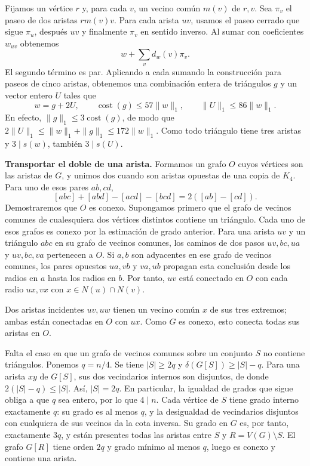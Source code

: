 \documentclass[spanish,11pt,a4paper]{article}
\begin{document}
Fijamos un vértice \(r\) y, para cada \(v\), un vecino común \(m(v)\) de \(r,v\). Sea \(\pi_v\) el paseo de dos aristas \(r m(v)v\). Para cada arista \(uv\), usamos el paseo cerrado que sigue \(\pi_u\), después \(uv\) y finalmente \(\pi_v\) en sentido inverso. Al sumar con coeficientes \(w_{uv}\) obtenemos \[w+\sum_v d_w(v)\pi_v.\] El segundo término es par. Aplicando a cada sumando la construcción para paseos de cinco aristas, obtenemos una combinación entera de triángulos \(g\) y un vector entero \(U\) tales que \[w=g+2U,\qquad \operatorname{cost}(g)\le57\|w\|_1,
\qquad \|U\|_1\le86\|w\|_1.
\tag{A.1}\] En efecto, \(\|g\|_1\le3\operatorname{cost}(g)\), de modo que \(2\|U\|_1\le\|w\|_1+\|g\|_1\le172\|w\|_1\). Como todo triángulo tiene tres aristas y \(3\mid s(w)\), también \(3\mid s(U)\).

\textbf{Transportar el doble de una arista.} Formamos un grafo \(O\) cuyos vértices son las aristas de \(G\), y unimos dos cuando son aristas opuestas de una copia de \(K_4\). Para uno de esos pares \(ab,cd\), \[[abc]+[abd]-[acd]-[bcd]=2([ab]-[cd]).
\tag{A.2}\] Demostraremos que \(O\) es conexo. Supongamos primero que el grafo de vecinos comunes de cualesquiera dos vértices distintos contiene un triángulo. Cada uno de esos grafos es conexo por la estimación de grado anterior. Para una arista \(uv\) y un triángulo \(abc\) en su grafo de vecinos comunes, los caminos de dos pasos \(uv,bc,ua\) y \(uv,bc,va\) pertenecen a \(O\). Si \(a,b\) son adyacentes en ese grafo de vecinos comunes, los pares opuestos \(ua,vb\) y \(va,ub\) propagan esta conclusión desde los radios en \(a\) hasta los radios en \(b\). Por tanto, \(uv\) está conectado en \(O\) con cada radio \(ux,vx\) con \(x\in N(u)\cap N(v)\).

Dos aristas incidentes \(uv,uw\) tienen un vecino común \(x\) de sus tres extremos; ambas están conectadas en \(O\) con \(ux\). Como \(G\) es conexo, esto conecta todas sus aristas en \(O\).

Falta el caso en que un grafo de vecinos comunes sobre un conjunto \(S\) no contiene triángulos. Ponemos \(q=n/4\). Se tiene \(|S|\ge2q\) y \(\delta(G[S])\ge|S|-q\). Para una arista \(xy\) de \(G[S]\), sus dos vecindarios internos son disjuntos, de donde \(2(|S|-q)\le|S|\). Así, \(|S|=2q\). En particular, la igualdad de grados que sigue obliga a que \(q\) sea entero, por lo que \(4\mid n\). Cada vértice de \(S\) tiene grado interno exactamente \(q\): su grado es al menos \(q\), y la desigualdad de vecindarios disjuntos con cualquiera de sus vecinos da la cota inversa. Su grado en \(G\) es, por tanto, exactamente \(3q\), y están presentes todas las aristas entre \(S\) y \(R=V(G)\setminus S\). El grafo \(G[R]\) tiene orden \(2q\) y grado mínimo al menos \(q\), luego es conexo y contiene una arista.
\end{document}
